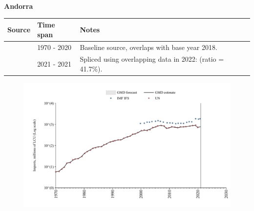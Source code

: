 \documentclass[12pt,a4paper,landscape]{article}
\begin{document}
\begin{adjustbox}{max totalsize={\paperwidth}{\paperheight},center}
\begin{minipage}[t][\textheight][t]{\textwidth}
\vspace*{0.5cm}
{}
\begin{center}
{\Large\bfseries Andorra}
\end{center}
\vspace{0.5cm}
\begin{table}[H]
\centering
\small
\begin{tabular}{|l|l|l|}
\hline
\textbf{Source} & \textbf{Time span} & \textbf{Notes} \\
\hline
\rowcolor{white}\cite{UN}& 1970 - 2020 &Baseline source, overlaps with base year 2018.\\
\rowcolor{lightgray}\cite{IMF_IFS}& 2021 - 2021 &Spliced using overlapping data in 2022: (ratio = 41.7\%).\\
\hline
\end{tabular}
\end{table}
\begin{figure}[H]
\centering
\includegraphics[width=\textwidth,height=0.6\textheight,keepaspectratio]{graphs/AND_imports.pdf}
\end{figure}
\end{minipage}
\end{adjustbox}
\end{document}
